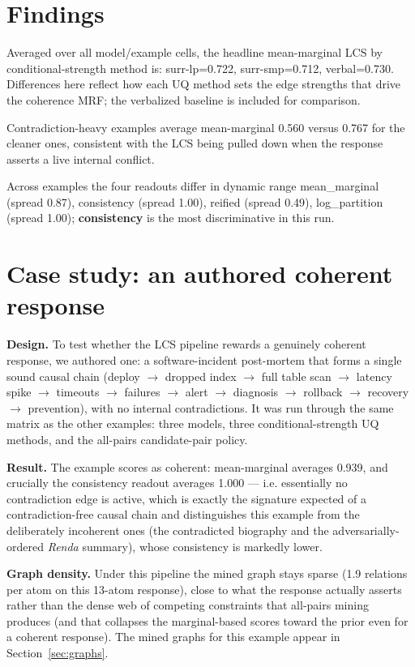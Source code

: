 \documentclass[11pt]{article}
\begin{document}
\section{Findings}

Averaged over all model/example cells, the headline mean-marginal LCS by conditional-strength method is: surr-lp=0.722, surr-smp=0.712, verbal=0.730. Differences here reflect how each UQ method sets the edge strengths that drive the coherence MRF; the verbalized baseline is included for comparison.

Contradiction-heavy examples average mean-marginal 0.560 versus 0.767 for the cleaner ones, consistent with the LCS being pulled down when the response asserts a live internal conflict.

Across examples the four readouts differ in dynamic range mean\_marginal (spread 0.87), consistency (spread 1.00), reified (spread 0.49), log\_partition (spread 1.00); \textbf{consistency} is the most discriminative in this run.

\section{Case study: an authored coherent response}

\textbf{Design.} To test whether the LCS pipeline rewards a genuinely coherent response, we authored one: a software-incident post-mortem that forms a single sound causal chain (deploy $\to$ dropped index $\to$ full table scan $\to$ latency spike $\to$ timeouts $\to$ failures $\to$ alert $\to$ diagnosis $\to$ rollback $\to$ recovery $\to$ prevention), with no internal contradictions. It was run through the same matrix as the other examples: three models, three conditional-strength UQ methods, and the all-pairs candidate-pair policy.

\textbf{Result.} The example scores as coherent: mean-marginal averages 0.939, and crucially the consistency readout averages 1.000 --- i.e. essentially no contradiction edge is active, which is exactly the signature expected of a contradiction-free causal chain and distinguishes this example from the deliberately incoherent ones (the contradicted biography and the adversarially-ordered \emph{Renda} summary), whose consistency is markedly lower.

\textbf{Graph density.} Under this pipeline the mined graph stays sparse (1.9 relations per atom on this 13-atom response), close to what the response actually asserts rather than the dense web of competing constraints that all-pairs mining produces (and that collapses the marginal-based scores toward the prior even for a coherent response). The mined graphs for this example appear in Section~\ref{sec:graphs}.
\end{document}
